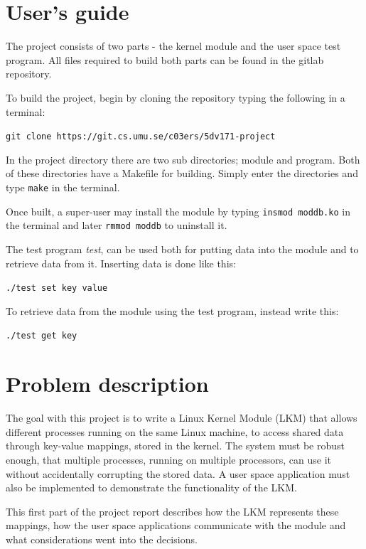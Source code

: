 \documentclass[final,a4paper]{article}
\newcommand{\codebase}{https://git.cs.umu.se/c03ers/5dv171-project}
\begin{document}
\section*{User's guide}
The project consists of two parts - the kernel module and the user space
test program. All files required to build both parts can be found in the gitlab
repository.

To build the project, begin by cloning the repository typing the following in
a terminal:
\begin{center}
{\tt git clone \codebase}
\end{center}
In the project directory there are two sub directories; module and program.
Both of these directories have a Makefile for building. Simply enter the
directories and type {\tt make} in the terminal.

Once built, a super-user may install the module by typing 
{\tt insmod moddb.ko} in the terminal and later {\tt rmmod moddb}
to uninstall it.

The test program \emph{test}, can be used both for putting data
into the module and to retrieve data from it. Inserting data is done like this:
\begin{center}
{\tt ./test set key value}
\end{center}
To retrieve data from the module using the test program, instead write this:
\begin{center}
{\tt ./test get key}
\end{center}

\section*{Problem description}
The goal with this project is to write a Linux Kernel Module (LKM) that allows
different processes running on the same Linux machine, to access shared data
through key-value mappings, stored in the kernel. The system must be robust
enough, that multiple processes, running on multiple processors, can use it
without accidentally corrupting the stored data. A user space application must
also be implemented to demonstrate the functionality of the LKM.

This first part of the project report describes how the LKM represents these
mappings, how the user space applications communicate with the module and
what considerations went into the decisions.\pagebreak
\end{document}
